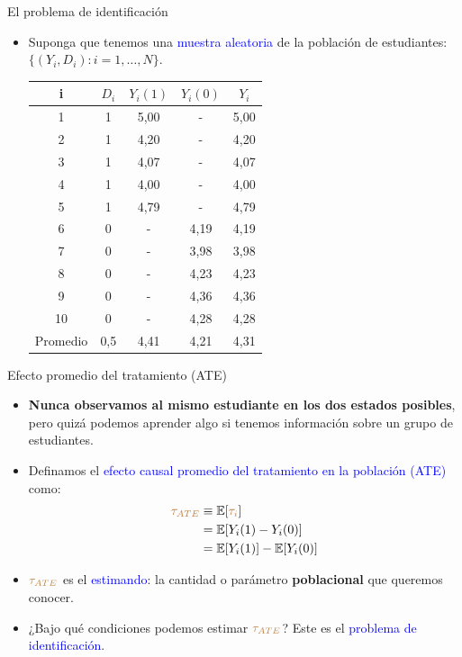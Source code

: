 \documentclass[10pt, xcolor=dvipsnames]{beamer}
\begin{document}
\begin{frame}{El problema de identificación}
\begin{itemize}
    \item Suponga que tenemos una \textcolor{blue}{muestra aleatoria} de la población de estudiantes: \(\{(Y_i,D_{i}): i = 1, \ldots, N\}\).
    \vspace{1.5em}
    \begin{table}[H]
    \centering
    \small
    \begin{tabular}{cccc c}
    \toprule
    i & $D_i$ & $Y_i(1)$ & $Y_i(0)$ & $Y_i$ \\
    \midrule
    1 & 1 & 5,00 &   -    & 5,00 \\
    2 & 1 & 4,20 &   -    & 4,20 \\
    3 & 1 & 4,07 &   -    & 4,07 \\
    4 & 1 & 4,00 &   -    & 4,00 \\
    5 & 1 & 4,79 &   -    & 4,79 \\
    6 & 0 & -    & 4,19  & 4,19 \\
    7 & 0 & -    & 3,98  & 3,98 \\
    8 & 0 & -    & 4,23  & 4,23 \\
    9 & 0 & -    & 4,36  & 4,36 \\
    10 & 0 & -    & 4,28  & 4,28 \\
    \midrule
    Promedio & 0,5 & 4,41 & 4,21 & 4,31 \\
    \bottomrule
    \end{tabular}
    \end{table}
\end{itemize}
\end{frame}


\begin{frame}{Efecto promedio del tratamiento (ATE)}
\begin{itemize}
    \item \textbf{Nunca observamos al mismo estudiante en los dos estados posibles}, pero quizá podemos aprender algo si tenemos información sobre un grupo de estudiantes.
    \vspace{0.5em}
    \item Definamos el \textcolor{blue}{efecto causal promedio del tratamiento en la población (ATE)} como:
    \begin{align*}
    \begin{split}
        \textcolor{brown}{\tau_{ATE}} &\equiv \operatorname{\mathbb{E}}[\textcolor{brown}{\tau_i}] \\ &= \operatorname{\mathbb{E}}[Y_i(1)-Y_i(0)] \\ &= \operatorname{\mathbb{E}}[Y_i(1)]-\operatorname{\mathbb{E}}[Y_i(0)]
    \end{split}	
    \end{align*}
    \vspace{0.0em}
    \item  \(\textcolor{brown}{\tau_{ATE}}\) es el \textcolor{blue}{estimando}: la cantidad o parámetro \textbf{poblacional} que queremos conocer.%
    \item ¿Bajo qué condiciones podemos estimar $\textcolor{brown}{\tau_{ATE}}$? Este es el \textcolor{blue}{problema de identificación}.
\end{itemize}
\end{frame}
\end{document}
